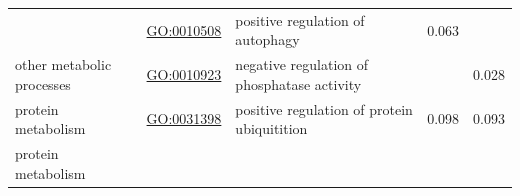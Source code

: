 \documentclass[
]{article}
\begin{document}
\begin{longtable}[]{@{}lllll@{}}
\begin{minipage}[t]{0.17\columnwidth}
\end{minipage} & \begin{minipage}[t]{0.17\columnwidth}\raggedright
\url{GO:0010508}\strut
\end{minipage} & \begin{minipage}[t]{0.17\columnwidth}\raggedright
positive regulation of autophagy\strut
\end{minipage} & \begin{minipage}[t]{0.17\columnwidth}\raggedright
0.063\strut
\end{minipage} & \begin{minipage}[t]{0.17\columnwidth}\raggedright
\strut
\end{minipage}\tabularnewline
\begin{minipage}[t]{0.17\columnwidth}\raggedright
other metabolic processes\strut
\end{minipage} & \begin{minipage}[t]{0.17\columnwidth}\raggedright
\url{GO:0010923}\strut
\end{minipage} & \begin{minipage}[t]{0.17\columnwidth}\raggedright
negative regulation of phosphatase activity\strut
\end{minipage} & \begin{minipage}[t]{0.17\columnwidth}\raggedright
\strut
\end{minipage} & \begin{minipage}[t]{0.17\columnwidth}\raggedright
0.028\strut
\end{minipage}\tabularnewline
\begin{minipage}[t]{0.17\columnwidth}\raggedright
protein metabolism\strut
\end{minipage} & \begin{minipage}[t]{0.17\columnwidth}\raggedright
\url{GO:0031398}\strut
\end{minipage} & \begin{minipage}[t]{0.17\columnwidth}\raggedright
positive regulation of protein ubiquitition\strut
\end{minipage} & \begin{minipage}[t]{0.17\columnwidth}\raggedright
0.098\strut
\end{minipage} & \begin{minipage}[t]{0.17\columnwidth}\raggedright
0.093\strut
\end{minipage}\tabularnewline
\begin{minipage}[t]{0.17\columnwidth}\raggedright
protein metabolism\strut
\end{minipage} & \begin{minipage}[t]{0.17\columnwidth}\raggedright

\end{minipage}
\end{longtable}
\end{document}
